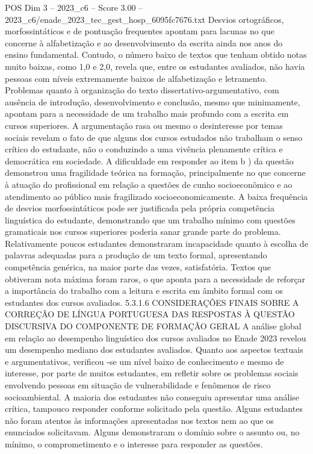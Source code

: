 \begin{textsample}{POS Dim 3 – 2023\_c6 – Score 3.00 – 2023\_c6/enade\_2023\_tec\_gest\_hosp\_6095fc7676.txt}
Desvios ortográficos, morfossintáticos e de pontuação frequentes apontam para lacunas no que concerne à alfabetização e ao desenvolvimento da escrita ainda nos anos do ensino fundamental.
Contudo, o número baixo de textos que tenham obtido notas muito baixas, como 1,0 e 2,0, revela que, entre os estudantes avaliados, não havia pessoas com níveis extremamente baixos de alfabetização e letramento.
Problemas quanto à organização do texto dissertativo-argumentativo, com ausência de introdução, desenvolvimento e conclusão, mesmo que minimamente, apontam para a necessidade de um trabalho mais profundo com a escrita em cursos superiores.
A argumentação rasa ou mesmo o desinteresse por temas sociais revelam o fato de que alguns dos cursos estudados não trabalham o senso crítico do estudante, não o conduzindo a uma vivência plenamente crítica e democrática em sociedade.
A dificuldade em responder ao item b ) da questão demonstrou uma fragilidade teórica na formação, principalmente no que concerne à atuação do profissional em relação a questões de cunho socioeconômico e ao atendimento ao público mais fragilizado socioeconomicamente.
A baixa frequência de desvios morfossintáticos pode ser justificada pela própria competência linguística do estudante, demonstrando que um trabalho mínimo com questões gramaticais nos cursos superiores poderia sanar grande parte do problema.
Relativamente poucos estudantes demonstraram incapacidade quanto à escolha de palavras adequadas para a produção de um texto formal, apresentando competência genérica, na maior parte das vezes, satisfatória.
Textos que obtiveram nota máxima foram raros, o que aponta para a necessidade de reforçar a importância do trabalho com a leitura e escrita em âmbito formal com os estudantes dos cursos avaliados. 5.3.1.6 CONSIDERAÇÕES FINAIS SOBRE A CORREÇÃO DE LÍNGUA PORTUGUESA DAS RESPOSTAS À QUESTÃO DISCURSIVA DO COMPONENTE DE FORMAÇÃO GERAL A análise global em relação ao desempenho linguístico dos cursos avaliados no Enade 2023 revelou um desempenho mediano dos estudantes avaliados.
Quanto aos aspectos textuais e argumentativos, verificou -se um nível baixo de conhecimento e mesmo de interesse, por parte de muitos estudantes, em refletir sobre os problemas sociais envolvendo pessoas em situação de vulnerabilidade e fenômenos de risco socioambiental.
A maioria dos estudantes não conseguiu apresentar uma análise crítica, tampouco responder conforme solicitado pela questão.
Alguns estudantes não foram atentos às informações apresentadas nos textos nem ao que os enunciados solicitavam.
Alguns demonstraram o domínio sobre o assunto ou, no mínimo, o comprometimento e o interesse para responder as questões.

\end{textsample}
